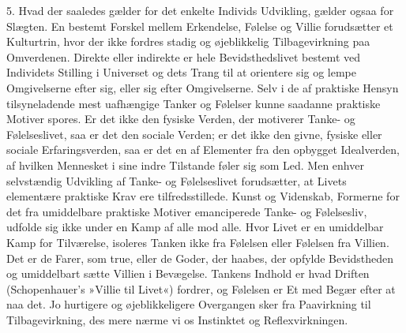 \documentclass[12pt,a4paper,openany]{book}
\begin{document}
5. Hvad der saaledes gælder for det enkelte Individs Udvikling, gælder
ogsaa for Slægten. En bestemt Forskel mellem Erkendelse, Følelse og
Villie forudsætter et Kulturtrin, hvor der ikke fordres stadig og
øjeblikkelig Tilbagevirkning paa Omverdenen. Direkte eller indirekte er
hele Bevidsthedslivet bestemt ved Individets Stilling i Universet og
dets Trang til at orientere sig og lempe Omgivelserne efter sig, eller
sig efter Omgivelserne. Selv i de af praktiske Hensyn tilsyneladende
mest uafhængige Tanker og Følelser kunne saadanne praktiske Motiver
spores. Er det ikke den fysiske Verden, der motiverer Tanke- og
Følelseslivet, saa er det den sociale Verden; er det ikke den givne,
fysiske eller sociale Erfaringsverden, saa er det en af Elementer fra
den opbygget Idealverden, af hvilken Mennesket i sine indre Tilstande
føler sig som Led. Men enhver selvstændig Udvikling af Tanke- og
Følelseslivet forudsætter, at Livets elementære praktiske Krav ere
tilfredsstillede. Kunst og Videnskab, Formerne for det fra umiddelbare
praktiske Motiver emanciperede Tanke- og Følelsesliv, udfolde sig ikke
under en Kamp af alle mod alle. Hvor Livet er en umiddelbar Kamp for
Tilværelse, isoleres Tanken ikke fra Følelsen eller Følelsen fra
Villien. Det er de Farer, som true, eller de Goder, der haabes, der
opfylde Bevidstheden og umiddelbart sætte Villien i Bevægelse. Tankens
Indhold er hvad Driften (Schopenhauer’s »Villie til Livet«) fordrer, og
Følelsen er Et med Begær efter at naa det. Jo hurtigere og
øjeblikkeligere Overgangen sker fra Paavirkning til Tilbagevirkning, des
mere nærme vi os Instinktet og Reflexvirkningen.
\end{document}
